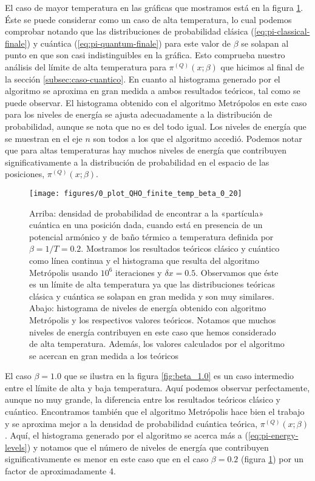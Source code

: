 \documentclass[%
 reprint,
 amsmath,amssymb,
 aps,
 pra,
]{revtex4-2}
\begin{document}
El caso de mayor temperatura en las gráficas que mostramos está en la figura \ref{fig:beta_0.2}. Éste se puede considerar como un caso de alta temperatura, lo cual podemos comprobar notando que las distribuciones de probabilidad clásica (\ref{eq:pi-classical-finale}) y cuántica (\ref{eq:pi-quantum-finale}) para este valor de $\beta$ se solapan al punto en que son casi indistinguibles en la gráfica. Esto comprueba nuestro análisis del límite de alta temperatura para $\pi^{(Q)}(x;\beta)$ que hicimos al final de la sección \ref{subsec:caso-cuantico}. En cuanto al histograma generado por el algoritmo se aproxima en gran medida a ambos resultados teóricos, tal como se puede observar. El histograma obtenido con el algoritmo Metrópolos en este caso para los niveles de energía se ajusta adecuadamente a la distribución de probabilidad, aunque se nota que no es del todo igual. Los niveles de energía que se muestran en el eje $n$ son todos a los que el algoritmo accedió. Podemos notar que para altas temperaturas hay muchos niveles de energía que contribuyen significativamente a la distribución de probabilidad en el espacio de las posiciones, $\pi^{(Q)}(x;\beta)$.

\begin{figure}[t]
	\centering
	\texttt{[image: figures/0\_plot\_QHO\_finite\_temp\_beta\_0\_20]}
	\caption{Arriba: densidad de probabilidad de encontrar a la «partícula» cuántica en una posición dada, cuando está en presencia de un potencial armónico y de baño térmico a temperatura definida por $\beta=1/T=0.2$. Mostramos los resultados teóricos clásico y cuántico como línea continua y el histograma que resulta del algoritmo Metrópolis usando $10^6$ iteraciones y $\delta x = 0.5$. Observamos que éste es un límite de alta temperatura ya que las distribuciones teóricas clásica y cuántica se solapan en gran medida y son muy similares. Abajo: histograma de niveles de energía obtenido con algoritmo Metrópolis y los respectivos valores teóricos. Notamos que muchos niveles de energía contribuyen en este caso que hemos considerado de alta temperatura. Además, los valores calculados por el algoritmo se acercan en gran medida a los teóricos}
	\label{fig:beta_0.2}
\end{figure}

El caso $\beta=1.0$ que se ilustra en la figura \ref{fig:beta_1.0} es un caso intermedio entre el límite de alta y baja temperatura. Aquí podemos observar perfectamente, aunque no muy grande, la diferencia entre los resultados teóricos clásico y cuántico. Encontramos también que el algoritmo Metrópolis hace bien el trabajo y se aproxima mejor a la densidad de probabilidad cuántica teórica, $\pi^{(Q)}(x;\beta)$. Aquí, el histograma generado por el algoritmo se acerca más a (\ref{eq:pi-energy-levels}) y notamos que el número de niveles de energía que contribuyen significativamente es menor en este caso que en el caso $\beta=0.2$ (figura \ref{fig:beta_0.2}) por un factor de aproximadamente 4.
\end{document}
